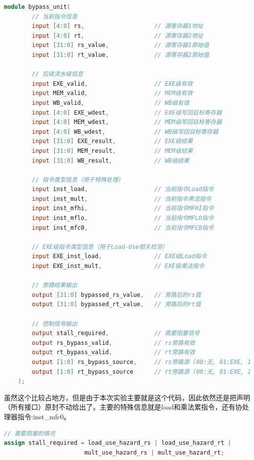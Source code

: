 \documentclass[a4paper]{article}
\begin{document}
\begin{lstlisting}[language=Verilog,caption={模块}]
    module bypass_unit(
        // 当前指令信息
        input [4:0] rs,                    // 源寄存器1地址
        input [4:0] rt,                    // 源寄存器2地址
        input [31:0] rs_value,             // 源寄存器1原始值
        input [31:0] rt_value,             // 源寄存器2原始值
        
        // 后续流水级信息
        input EXE_valid,                   // EXE级有效
        input MEM_valid,                   // MEM级有效
        input WB_valid,                    // WB级有效
        input [4:0] EXE_wdest,             // EXE级写回目标寄存器
        input [4:0] MEM_wdest,             // MEM级写回目标寄存器
        input [4:0] WB_wdest,              // WB级写回目标寄存器
        input [31:0] EXE_result,           // EXE级结果
        input [31:0] MEM_result,           // MEM级结果
        input [31:0] WB_result,            // WB级结果
        
        // 指令类型信息（用于特殊处理）
        input inst_load,                   // 当前指令Load指令
        input inst_mult,                   // 当前指令乘法指令
        input inst_mfhi,                   // 当前指令MFHI指令
        input inst_mflo,                   // 当前指令MFLO指令
        input inst_mfc0,                   // 当前指令MFC0指令
        
        // EXE级指令类型信息（用于Load-Use相关检测）
        input EXE_inst_load,               // EXE级Load指令
        input EXE_inst_mult,               // EXE级乘法指令
        
        // 旁路结果输出
        output [31:0] bypassed_rs_value,   // 旁路后的rs值
        output [31:0] bypassed_rt_value,   // 旁路后的rt值
        
        // 控制信号输出
        output stall_required,             // 需要阻塞信号
        output rs_bypass_valid,            // rs旁路有效
        output rt_bypass_valid,            // rt旁路有效
        output [1:0] rs_bypass_source,     // rs旁路源 (00:无, 01:EXE, 10:MEM, 11:WB)
        output [1:0] rt_bypass_source      // rt旁路源 (00:无, 01:EXE, 10:MEM, 11:WB)
    );    
\end{lstlisting}

虽然这个比较占地方，但是由于本次实验主要就是这个代码，因此依然还是把声明（所有接口）原封不动给出了。主要的特殊信息就是load和乘法累指令，还有协处理器指令:inst\_mfc0。 


\begin{lstlisting}[language=Verilog,caption={阻塞控制信号-产生}]
// 需要阻塞的情况
assign stall_required = load_use_hazard_rs | load_use_hazard_rt | 
                       mult_use_hazard_rs | mult_use_hazard_rt;
\end{lstlisting}
\end{document}
